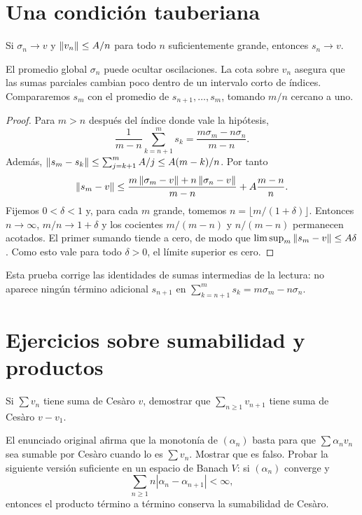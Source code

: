 \section{Una condición tauberiana}
\begin{teorema}
Si $\sigma_n\to v$ y $\left\lVert v_n\right\rVert\leq A/n$ para todo $n$ suficientemente grande, entonces $s_n\to v$.
\end{teorema}
\begin{estrategia}
El promedio global $\sigma_n$ puede ocultar oscilaciones. La cota sobre $v_n$ asegura que las sumas parciales cambian poco dentro de un intervalo corto de índices. Compararemos $s_m$ con el promedio de $s_{n+1},\ldots,s_m$, tomando $m/n$ cercano a uno.
\end{estrategia}
\begin{proof}
Para $m>n$ después del índice donde vale la hipótesis,
\[
 \frac1{m-n}\sum_{k=n+1}^ms_k=\frac{m\sigma_m-n\sigma_n}{m-n}.
\]
Además, $\left\lVert s_m-s_k\right\rVert\leq\sum_{j=k+1}^m A/j\leq A(m-k)/n$. Por tanto
\[
 \left\lVert s_m-v\right\rVert\leq
 \frac{m\left\lVert\sigma_m-v\right\rVert+n\left\lVert\sigma_n-v\right\rVert}{m-n}
 +A\frac{m-n}{n}.
\]
Fijemos $0<\delta<1$ y, para cada $m$ grande, tomemos $n=\lfloor m/(1+\delta)\rfloor$. Entonces $n\to\infty$, $m/n\to1+\delta$ y los cocientes $m/(m-n)$ y $n/(m-n)$ permanecen acotados. El primer sumando tiende a cero, de modo que $\limsup_m\left\lVert s_m-v\right\rVert\leq A\delta$. Como esto vale para todo $\delta>0$, el límite superior es cero.
\end{proof}
Esta prueba corrige las identidades de sumas intermedias de la lectura: no aparece ningún término adicional $s_{n+1}$ en $\sum_{k=n+1}^ms_k=m\sigma_m-n\sigma_n$.

\section{Ejercicios sobre sumabilidad y productos}
\begin{ejercicio}\label{ej:v4-l01-1}
Si $\sum v_n$ tiene suma de Cesàro $v$, demostrar que $\sum_{n\geq1}v_{n+1}$ tiene suma de Cesàro $v-v_1$.
\end{ejercicio}


\begin{ejercicio}\label{ej:v4-l01-2}
El enunciado original afirma que la monotonía de $(\alpha_n)$ basta para que $\sum\alpha_nv_n$ sea sumable por Cesàro cuando lo es $\sum v_n$. Mostrar que es falso. Probar la siguiente versión suficiente en un espacio de Banach $V$: si $(\alpha_n)$ converge y
\[
 \sum_{n\geq1} n|\alpha_n-\alpha_{n+1}|<\infty,
\]
entonces el producto término a término conserva la sumabilidad de Cesàro.
\end{ejercicio}


